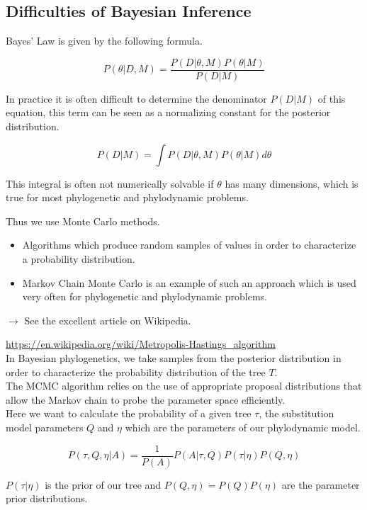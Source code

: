 \documentclass{article}
\begin{document}
\begin{multicols*}{3}
\subsection{Difficulties of Bayesian Inference}

Bayes' Law is given by the following formula. 

$$P(\theta|D,M) = \frac{P(D|\theta,M)P(\theta|M)}{P(D|M)}$$

In practice it is often difficult to determine the denominator $P(D|M)$ of this equation, this term can be seen as a normalizing constant for the posterior distribution. 

$$P(D|M) = \int P(D|\theta,M)P(\theta|M)d\theta$$

This integral is often not numerically solvable if $\theta$ has many dimensions, which is true for most phylogenetic and phylodynamic problems. 

Thus we use Monte Carlo methods. 
\begin{itemize}
    \item Algorithms which produce random samples of values in order to characterize a probability distribution. 
    \item Markov Chain Monte Carlo is an example of such an approach which is used very often for phylogenetic and phylodynamic problems.
\end{itemize}

$\rightarrow$ See the excellent article on Wikipedia.

\url{https://en.wikipedia.org/wiki/Metropolis-Hastings_algorithm}\\

In Bayesian phylogenetics, we take samples from the posterior distribution in order to characterize the probability distribution of the tree $T$.\\

The MCMC algorithm relies on the use of appropriate proposal distributions that allow the Markov chain to probe the parameter space efficiently.\\

Here we want to calculate the probability of a given tree $\tau$, the substitution model parameters $Q$ and $\eta$ which are the parameters of our phylodynamic model.

$$P(\tau, Q, \eta|A) = \frac{1}{P(A)} P(A|\tau, Q)P(\tau|\eta)P(Q,\eta)$$

$P(\tau|\eta)$ is the prior of our tree and $P(Q,\eta) = P(Q)P(\eta)$ are the parameter prior distributions.\\


\end{multicols*}
\end{document}
